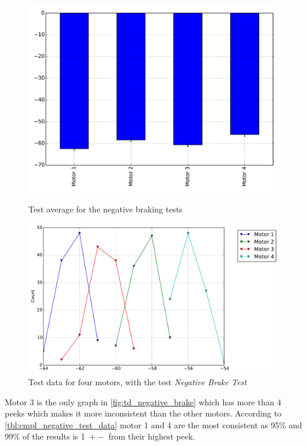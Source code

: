 \begin{figure}[!htb]
    \centering
    \begin{minipage}{.5\textwidth}
        \centering
        \includegraphics[width=1\textwidth]{graphics/test_graphs/Break_negative_barplot.pdf}
        \caption{Test average for the negative braking tests}
     	\label{fig:td_negative_brake}
    \end{minipage}%
    \begin{minipage}{0.5\textwidth}
        \centering
		 \includegraphics[width=1\textwidth]{graphics/test_graphs/Break_negative_lineplot.pdf}
		 \caption{Test data for four motors, with the test \emph{Negative Brake Test}}
		 \label{fig:cmp_all_negative}
    \end{minipage}
\end{figure}

Motor 3 is the only graph in  \cref{fig:td_negative_brake} which has more than 4 peeks which makes it more inconsistent than the other motors. According to \cref{tbl:cmpl_negative_test_data} motor 1 and 4 are the most consistent as 95\% and 99\% of the results is 1\degree\ $+-$ from their highest peek.

